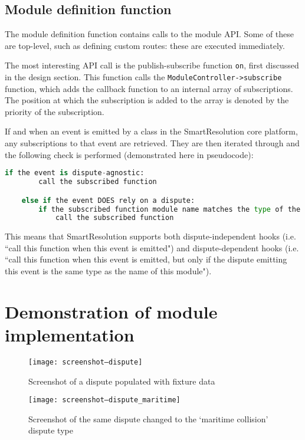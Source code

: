 \subsection{Module definition function}

The module definition function contains calls to the module API. Some of these are top-level, such as defining custom routes: these are executed immediately.

The most interesting API call is the publish-subscribe function \lstinline{on}, first discussed in the design section. This function calls the \lstinline{ModuleController->subscribe} function, which adds the callback function to an internal array of subscriptions. The position at which the subscription is added to the array is denoted by the priority of the subscription.

If and when an event is emitted by a class in the SmartResolution core platform, any subscriptions to that event are retrieved. They are then iterated through and the following check is performed (demonstrated here in pseudocode):

\begin{lstlisting}[language=python]
	if the event is dispute-agnostic:
	    call the subscribed function

	else if the event DOES rely on a dispute:
	    if the subscribed function module name matches the type of the current dispute:
	        call the subscribed function
\end{lstlisting}

This means that SmartResolution supports both dispute-independent hooks (i.e. ``call this function when this event is emitted") and dispute-dependent hooks (i.e. ``call this function when this event is emitted, but only if the dispute emitting this event is the same type as the name of this module").

\section{Demonstration of module implementation}

\begin{figure}[h!]
  \centering
    \ifimages
    \texttt{[image: screenshot--dispute]}
    \fi
  \caption{Screenshot of a dispute populated with fixture data}
  \label{screenshot:dispute}
\end{figure}

\begin{figure}[h!]
  \centering
    \ifimages
    \texttt{[image: screenshot--dispute\_maritime]}
    \fi
  \caption{Screenshot of the same dispute changed to the `maritime collision' dispute type}
  \label{screenshot:disputeMaritime}
\end{figure}

